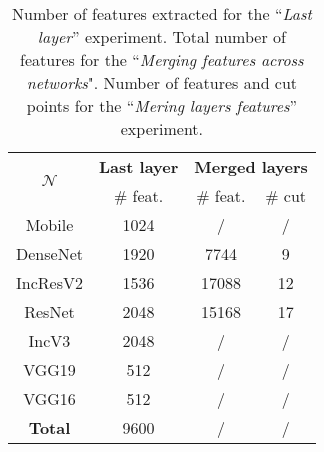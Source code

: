  \begin{table}
     \center 
     \begin{tabular}{|c|c|c|c|}
         \hline
         \multirow{2}{*}{$\mathcal{N}$} & \multicolumn{1}{c|}{\textbf{Last layer}} & \multicolumn{2}{c|}{\textbf{Merged layers}} \\
         \cline{2-4}
         & \# feat. & \# feat. & \# cut \\
         \hline
         Mobile & 1024 & / & /\\ 
         DenseNet & 1920 & 7744 & 9 \\ 
         IncResV2 & 1536 & 17088 & 12 \\ 
         ResNet & 2048 & 15168 & 17 \\ 
         IncV3 & 2048 & / & / \\ 
         VGG19 & 512 & / & / \\ 
         VGG16 & 512 & / & / \\  
         \hline
         \textbf{Total} & 9600 & / & / \\
         \hline 
     \end{tabular}
     \caption{Number of features extracted for the ``\textit{Last layer}'' experiment. Total number of features for the ``\textit{Merging features across networks}". Number of features and cut points for the ``\textit{Mering layers features}'' experiment.}
     \label{app:comp:tab:n_features_per_net}
 \end{table}
 


